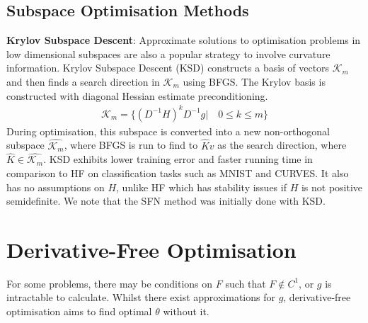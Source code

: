 \subsection{Subspace Optimisation Methods}\label{sec:subspace_opt}

\textbf{Krylov Subspace Descent}: Approximate solutions to optimisation problems in low dimensional subspaces are also a popular strategy to involve curvature information. Krylov Subspace Descent (KSD) constructs a basis of vectors $\mathcal{K}_m$ and then finds a search direction in $\mathcal{K}_m$ using BFGS. The Krylov basis is constructed with diagonal Hessian estimate preconditioning.
\begin{align}
    \mathcal{K}_m = \{(D^{-1}H)^{k}D^{-1}g | \quad 0 \leq k \leq m \}
\end{align}
During optimisation, this subspace is converted into a new non-orthogonal subspace $\hat{\mathcal{K}_m}$, where BFGS is run to find to ${\hat{K}v}$ as the search direction, where $\hat{K} \in \hat{\mathcal{K}_m}$. KSD exhibits lower training error and faster running time in comparison to HF on classification tasks such as MNIST and CURVES. It also has no assumptions on $H$, unlike HF which has stability issues if $H$ is not positive semidefinite. We note that the SFN method was initially done with KSD. 

\section{Derivative-Free Optimisation}
For some problems, there may be conditions on $F$ such that $F \notin C^1$, or $g$ is intractable to calculate. Whilst there exist approximations for $g$, derivative-free optimisation aims to find optimal $\theta$ without it.

